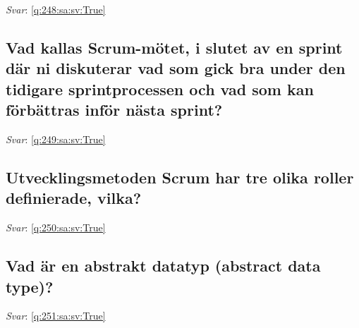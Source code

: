 \documentclass[a4paper,11pt,oneside]{article}
\begin{document}
\begin{sloppypar}
\noindent\makebox[\textwidth]{\hrulefill}

\vspace{1cm}

\textit{Svar}: \autoref{q:248:sa:sv:True}



\subsection{Vad kallas Scrum-m\"otet, i slutet av en sprint d\"ar ni diskuterar vad som gick bra under den tidigare sprintprocessen och vad som kan f\"orb\"attras inf\"or n\"asta sprint?}

\label{q:249:sa:sv:False}

\vspace{2cm}

\noindent\makebox[\textwidth]{\hrulefill}

\vspace{1cm}

\textit{Svar}: \autoref{q:249:sa:sv:True}



\subsection{Utvecklingsmetoden Scrum har tre olika roller definierade, vilka?}

\label{q:250:sa:sv:False}

\vspace{2cm}

\noindent\makebox[\textwidth]{\hrulefill}

\vspace{1cm}

\textit{Svar}: \autoref{q:250:sa:sv:True}



\subsection{Vad \"ar en abstrakt datatyp (abstract data type)?}

\label{q:251:sa:sv:False}

\vspace{2cm}

\noindent\makebox[\textwidth]{\hrulefill}

\vspace{1cm}

\textit{Svar}: \autoref{q:251:sa:sv:True}




\end{sloppypar}
\end{document}
